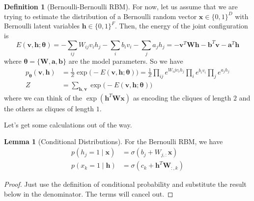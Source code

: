 \documentclass{article}
\theoremstyle{definition}
\newtheorem{lemma}[theorem]{Lemma}
\theoremstyle{remark}
\theoremstyle{definition}
\newtheorem{definition}{Definition}[section]
\begin{document}
      \begin{definition}[Bernoulli-Bernoulli RBM]
        For now, let us assume that we are trying to estimate the distribution of a Bernoulli random vector $\mathbf{x} \in \{0, 1\}^D$ with Bernoulli latent variables $\mathbf{h} \in \{0, 1\}^F$. Then, the energy of the joint configuration is  
          \[E(\mathbf{v}, \mathbf{h}; \boldsymbol{\theta}) = - \sum_{ij} W_{ij} v_i h_j - \sum_i b_i v_i - \sum_j a_j h_j = - \mathbf{v}^T \mathbf{W} \mathbf{h} - \mathbf{b}^T \mathbf{v} - \mathbf{a}^T \mathbf{h}\]
        where $\boldsymbol{\theta} = \{\mathbf{W}, \mathbf{a}, \mathbf{b}\}$ are the model parameters. So we have 
          \begin{align*} 
            p_{\boldsymbol{\theta}} (\mathbf{v}, \mathbf{h}) & = \frac{1}{Z} \exp \big( -E (\mathbf{v}, \mathbf{h}; \boldsymbol{\theta})\big) = \frac{1}{Z} \prod_{ij} e^{W_ij v_i h_j} \prod_i e^{b_i v_i} \prod_j e^{a_j h_j} \\
            Z & = \sum_{\mathbf{h}, \mathbf{v}} \exp \big( -E(\mathbf{v}, \mathbf{h}; \boldsymbol{\theta}) \big) 
          \end{align*}
        where we can think of the $\exp(\mathbf{h}^T \mathbf{W} \mathbf{x})$ as encoding the cliques of length $2$ and the others as cliques of length $1$.  
      \end{definition}

      Let's get some calculations out of the way. 

      \begin{lemma}[Conditional Distributions] 
        For the Bernoulli RBM, we have 
        \begin{align*} 
          p(h_j = 1 \mid \mathbf{x}) & = \sigma ( b_j + W_{j,:} \mathbf{x}) \\
          p(x_k = 1 \mid \mathbf{h}) & = \sigma ( c_k + \mathbf{h}^T \mathbf{W}_{:, k})
        \end{align*}
      \end{lemma}
      \begin{proof}
        Just use the definition of conditional probability and substitute the result below in the denominator. The terms will cancel out. 
      \end{proof}
\end{document}
